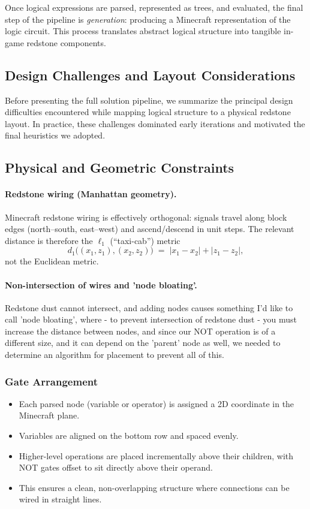 \documentclass[11pt]{diazessay} %
\begin{document}
Once logical expressions are parsed, represented as trees, and evaluated,
the final step of the pipeline is \textit{generation}: producing a Minecraft
representation of the logic circuit. This process translates abstract
logical structure into tangible in-game redstone components.

\subsection{Design Challenges and Layout Considerations}

Before presenting the full solution pipeline, we summarize the principal design
difficulties encountered while mapping logical structure to a physical redstone
layout. In practice, these challenges dominated early iterations and motivated
the final heuristics we adopted.

\subsection{Physical and Geometric Constraints}

\paragraph{Redstone wiring (Manhattan geometry).}
Minecraft redstone wiring is effectively orthogonal: signals travel along block
edges (north--south, east--west) and ascend/descend in unit steps. The relevant
distance is therefore the $\ell_1$ (``taxi-cab'') metric
\[
d_1\big((x_1,z_1),(x_2,z_2)\big) \;=\; |x_1-x_2| + |z_1-z_2|,
\]
not the Euclidean metric.

\paragraph{Non-intersection of wires and 'node bloating'.}
Redstone dust cannot intersect, and adding nodes causes something I'd like to call 'node bloating', where - to prevent intersection of redstone dust - you must increase the distance between nodes, and since our NOT operation is of a different size, and it can depend on the 'parent' node as well, we needed to determine an algorithm for placement to prevent all of this.



\subsubsection*{Gate Arrangement}
\begin{itemize}
    \item Each parsed node (variable or operator) is assigned a
    2D coordinate in the Minecraft plane.
    \item Variables are aligned on the bottom row and spaced evenly.
    \item Higher-level operations are placed incrementally above their
    children, with NOT gates offset to sit directly above their operand.
    \item This ensures a clean, non-overlapping structure where
    connections can be wired in straight lines.
\end{itemize}
\end{document}
